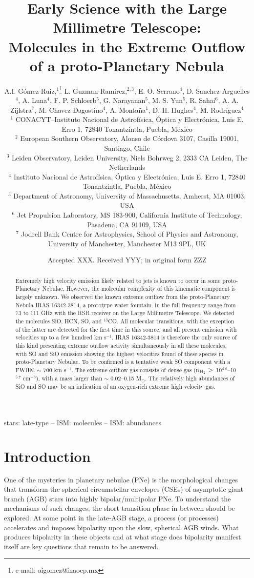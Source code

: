 \documentclass[a4paper,fleqn,usenatbib]{mnras}
\title[Molecules in the Extreme Outflow of a pPN]{\center Early Science with the Large Millimetre Telescope: \\Molecules in the Extreme Outflow of a proto-Planetary Nebula}
\author[A.I. G\'omez-Ruiz et al.]{A.I. G\'omez-Ruiz,$^{1}$\thanks{e-mail: aigomez@inaoep.mx} 
L. Guzman-Ramirez,$^{2,3}$, E. O. Serrano$^{4}$, D. Sanchez-Arguelles$^{4}$, \newauthor 
A. Luna$^{4}$, F. P. Schloerb$^{5}$, G. Narayanan$^{5}$, M. S. Yun$^{5}$, R. Sahai$^{6}$, A. A. Zijlstra$^{7}$, \newauthor
M. Chavez-Dagostino$^{4}$, A. Monta\~na$^{1}$, D. H. Hughes$^{4}$, M. Rodr\'iguez$^{4}$ 
\\
$^{1}$ CONACYT--Instituto Nacional de Astrof\'isica, \'Optica y Electr\'onica, Luis E. Erro 1, 72840 Tonantzintla, Puebla, M\'exico\\
$^{2}$ European Southern Observatory, Alonso de C\'ordova 3107, Casilla 19001, Santiago, Chile\\
$^{3}$ Leiden Observatory, Leiden University, Niels Bohrweg 2, 2333 CA Leiden, The Netherlands\\
$^{4}$ Instituto Nacional de Astrof\'isica, \'Optica y Electr\'onica, Luis E. Erro 1, 72840 Tonantzintla, Puebla, M\'exico\\
$^{5}$ Department of Astronomy, University of Massachusetts, Amherst, MA 01003, USA\\
$^{6}$ Jet Propulsion Laboratory, MS 183-900, California Institute of Technology, Pasadena, CA 91109, USA\\
$^{7}$ Jodrell Bank Centre for Astrophysics, School of Physics and Astronomy, University of Manchester, Manchester M13 9PL, UK\\
}
\date{Accepted XXX. Received YYY; in original form ZZZ}
\begin{document}
\label{firstpage}
\pagerange{\pageref{firstpage}--\pageref{lastpage}}
\maketitle

\begin{abstract}
Extremely high velocity emission likely related to jets is known to occur in some proto-Planetary Nebulae. However, the molecular complexity of this kinematic component is largely unknown. We observed the known extreme outflow from the proto-Planetary Nebula IRAS 16342-3814, a prototype water fountain, in the full frequency range from 73 to 111 GHz with the RSR receiver on the Large Millimetre Telescope. We detected the molecules SiO, HCN, SO, and $^{13}$CO. All molecular transitions, with the exception of the latter are detected for the first time in this source, and all present emission with velocities up to a few hundred km s$^{-1}$. IRAS 16342-3814 is therefore the only source of this kind presenting extreme outflow activity simultaneously in all these molecules, with SO and SiO emission showing the highest velocities found of these species in proto-Planetary Nebulae. To be confirmed is a tentative weak SO component with a FWHM $\sim$ 700 km s$^{-1}$. The extreme outflow gas consists of dense gas (n$_{\rm H_2} >$ 10$^{4.8}$--10$^{5.7}$ cm$^{-3}$), with a mass larger than $\sim$ 0.02--0.15 M$_{\odot}$. The relatively high abundances of SiO and SO may be an indication of an oxygen-rich extreme high velocity gas. 
\end{abstract}

\begin{keywords}
stars: late-type -- ISM: molecules -- ISM: abundances
\end{keywords}


\section{Introduction}

One of the mysteries in planetary nebulae (PNe) is the morphological changes that transform the spherical circumstellar envelopes (CSEs) of asymptotic giant branch (AGB) stars into highly bipolar/multipolar PNe. To understand the mechanisms of such changes, the short transition phase in between should be explored. At some point in the late-AGB stage, a process (or processes) accelerates and imposes bipolarity upon the slow, spherical AGB winds. What produces bipolarity in these objects and at what stage does bipolarity manifest itself are key questions that remain to be answered.
\end{document}
